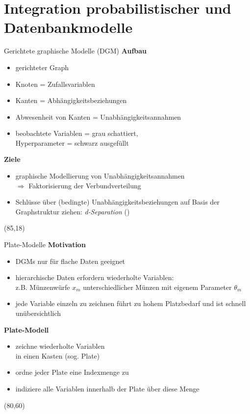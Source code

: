 \documentclass{beamer}
\newcommand{\adjustTikzSize}[0]{\Large}
\newcommand{\tikzScale}[0]{0.55}
\newcommand{\scite}[1]{ {\scriptsize \textcolor{cgray}{(\cite{#1})}} }
\begin{document}
\section{Integration probabilistischer und Datenbankmodelle}
\begin{frame}{Gerichtete graphische Modelle (DGM)}
\textbf{Aufbau}
\begin{itemize}
\item gerichteter Graph
\item Knoten = Zufallsvariablen
\item Kanten = Abhängigkeitsbeziehungen
\item Abwesenheit von Kanten = Unabhängigkeitsannahmen
\item beobachtete Variablen = grau schattiert,\\Hyperparameter = schwarz ausgefüllt
\end{itemize}

\textbf{Ziele}
\begin{itemize}
\item graphische Modellierung von Unabhängigkeitsannahmen\\$\Rightarrow$ Faktorisierung der Verbundverteilung
\item Schlüsse über (bedingte) Unabhängigkeitsbeziehungen auf Basis der Graphstruktur ziehen: \emph{d-Separation}\scite{pearl1988probabilistic}
\end{itemize}

\begin{textblock}{10}(85,18)
	\scalebox{\tikzScale}{\adjustTikzSize }
\end{textblock}
\end{frame}

\begin{frame}{Plate-Modelle}
\textbf{Motivation}
\begin{itemize}
\item DGMs nur für flache Daten geeignet
\item hierarchische Daten erfordern wiederholte Variablen:\\
z.B. Münzenwürfe $x_m$ unterschiedlicher Münzen mit eigenem Parameter $\theta_m$
\item jede Variable einzeln zu zeichnen führt zu hohem Platzbedarf und ist schnell unübersichtlich
\end{itemize}

\vspace*{0.5em}
\textbf{Plate-Modell}
\begin{itemize}
\item zeichne wiederholte Variablen\\ in einen Kasten (sog. Plate)
\item ordne jeder Plate eine Indexmenge zu
\item indiziere alle Variablen innerhalb der Plate über diese Menge
\end{itemize}

\begin{textblock}{10}(80,60)
	\scalebox{\tikzScale}{\adjustTikzSize }
\end{textblock}
\end{frame}
\end{document}
